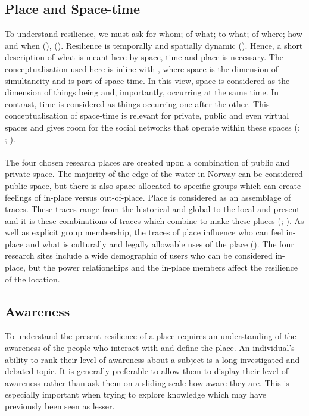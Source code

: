 \subsection{Place and Space-time} 
To understand resilience, we must ask for whom; of what; to what; of where; how and when (\cite{cutter_community_2020}), (\cite{moser_turbulent_2019}). Resilience is temporally and spatially dynamic (\cite{cutter_community_2020}). Hence, a short description of what is meant here by space, time and place is necessary. The conceptualisation used here is inline with \cite{massey_for_2005}, where space is the dimension of simultaneity and is part of space-time. In this view, space is considered as the dimension of things being and, importantly, occurring at the same time. In contrast, time is considered as things occurring one after the other. This conceptualisation of space-time is relevant for private, public and even virtual spaces and gives room for the social networks that operate within these spaces (\cite{massey_for_2005}; \cite{allen_rethinking_1998}; \cite{del_casino_social_2009}).

\paragraph{}
The four chosen research places are created upon a combination of public and private space. The majority of the edge of the water in Norway can be considered public space, but there is also space allocated to specific groups which can create feelings of in-place versus out-of-place. Place is considered as an assemblage of traces. These traces range from the historical and global to the local and present and it is these combinations of traces which combine to make these places (\cite{anderson_understanding_2015}; \cite{massey_for_2005}). As well as explicit group membership, the traces of place influence who can feel in-place and what is culturally and legally allowable uses of the place (\cite{anderson_understanding_2015}). The four research sites include a wide demographic of users who can be considered in-place, but the power relationships and the in-place members affect the resilience of the location. 

\subsection{Awareness}
To understand the present resilience of a place requires an understanding of the awareness of the people who interact with and define the place. An individual’s ability to rank their level of awareness about a subject is a long investigated and debated topic. It is generally preferable to allow them to display their level of awareness rather than ask them on a sliding scale how aware they are. This is especially important when trying to explore knowledge which may have previously been seen as lesser.


